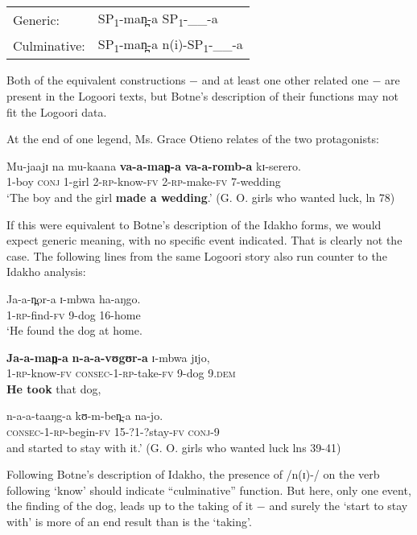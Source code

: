 \documentclass[output=paper]{langsci/langscibook}
\begin{document}
\begin{tabular}{ll}
Generic:  & SP\textsubscript{1}-man̪-a   SP\textsubscript{1}-\_\_-a \\
Culminative:  & SP\textsubscript{1}-man̪-a  n(i)-SP\textsubscript{1}-\_\_-a
\end{tabular}

Both of the equivalent constructions $-$ and at least one other related one $-$ are present in the Logoori texts, but Botne’s description of their functions may not fit the Logoori data.

At the end of one legend, Ms. Grace Otieno relates of the two protagonists:

\ea\label{ex:sarvasy:26}
\gll Mu-jaajɪ   na   mu-kaana   \textbf{va-a-man̪-a}   \textbf{va-a-romb-a}     kɪ-serero. \\
1-boy    \textsc{conj}  1-girl    2-\textsc{rp}-know-\textsc{fv}  2-\textsc{rp}-make-\textsc{fv}  7-wedding \\
\glt ‘The boy and the girl \textbf{made a wedding}.’ (G. O. girls who wanted luck, ln 78)
\z

If this were equivalent to Botne’s description of the Idakho forms, we would expect generic meaning, with no specific event indicated. That is clearly not the case. The following lines from the same Logoori story also run counter to the Idakho analysis: 

\ea\label{ex:sarvasy:27}
\gll Ja-a-n̪or-a   ɪ-mbwa   ha-aŋgo. \\
1-\textsc{rp}-find-\textsc{fv}  9-dog    16-home \\
\glt ‘He found the dog at home.

\gll \textbf{Ja-a-man̪-a}   \textbf{n-a-a-vʊgʊr-a}     ɪ-mbwa   jɪjo, \\
1-\textsc{rp}-know-\textsc{fv}  \textsc{consec}-1-\textsc{rp}-take-\textsc{fv}  9-dog    9.\textsc{dem} \\
\glt \textbf{He took} that dog,

\gll n-a-a-taaŋg-a       kʊ-m-ben̪-a     na-jo. \\
\textsc{consec}-1-\textsc{rp}-begin-\textsc{fv}  15-?1-?stay-\textsc{fv}  \textsc{conj}-9 \\
\glt and started to stay with it.’ (G. O. girls who wanted luck lns 39-41)
\z 

Following Botne’s description of Idakho, the presence of /n(ɪ)-/ on the verb following ‘know’ should indicate “culminative” function. But here, only one event, the finding of the dog, leads up to the taking of it $-$ and surely the ‘start to stay with’ is more of an end result than is the ‘taking’.
\end{document}
